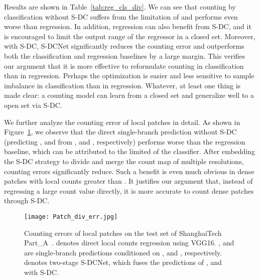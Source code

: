 \documentclass[10pt,twocolumn,letterpaper]{article}
\begin{document}
	Results are shown in Table~\ref{tab:reg_cls_div}. We can see that counting by classification without S-DC suffers from the limitation of  and performs even worse than regression. In addition, regression can also benefit from S-DC, and it is encouraged to limit the output range of the regressor in a closed set. Moreover, with S-DC, S-DCNet significantly reduces the counting error and outperforms both the classification and regression baselines by a large margin. This verifies our argument that it is more effective to reformulate counting in classification than in regression. Perhaps the optimization is easier and less sensitive to sample imbalance in classification than in regression. Whatever, at least one thing is made clear: a counting model can learn from a closed set and generalize well to a open set via S-DC.
	






	






	We further analyze the counting error of  local patches in detail. As shown in Figure~\ref{fig:patch_div_err}, we observe that the direct single-branch prediction without S-DC (predicting ,  and  from ,  and , respectively) performs worse than the regression baseline, which can be attributed to the limited  of the classifier. After embedding the S-DC strategy to divide and merge the count map of multiple resolutions, counting errors significantly reduce. Such a benefit is even much obvious in dense patches with local counts greater than . It justifies our argument that, instead of regressing a large count value directly, it is more accurate to count dense patches through S-DC. 
	
\begin{figure}[t]
		\begin{center}
\texttt{[image: Patch\_div\_err.jpg]}
		\end{center}
		\vspace{-10pt}
		\caption{Counting errors of  local patches on the test set of ShanghaiTech Part\_A~\cite{MCNN_2016_CVPR}.  denotes direct local counts regression using VGG16. ,  and  are single-branch predictions conditioned on ,  and , respectively.  denotes two-stage S-DCNet, which fuses the predictions of ,  and  with S-DC.}
		\label{fig:patch_div_err}
		\vspace{-10pt}
	\end{figure}
	
\end{document}

